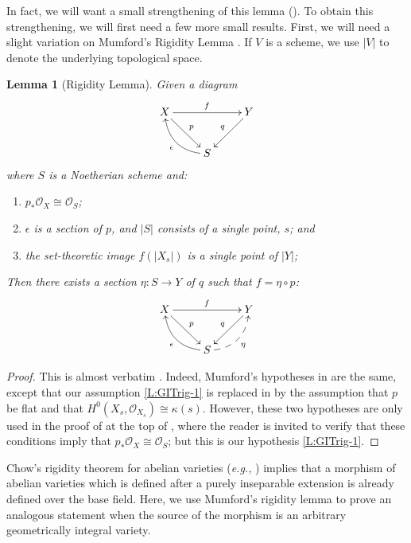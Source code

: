 \documentclass[11pt, reqno]{amsart}
\numberwithin{equation}{section}
\newtheorem{lem}[teo]{Lemma}
\theoremstyle{definition}
\theoremstyle{remark}
\def\iso{\cong}
\newcommand{\abs}[1]{{\left|#1\right|}}
\begin{document}
In fact, we will want a small strengthening of this lemma ().  To obtain this strengthening, we will first need a few more small results.  First, we will need a slight variation on 
Mumford's Rigidity Lemma \cite[Prop.~6.1(1)]{mumfordGIT}.  If $V$ is a scheme, we use $\abs V$ to denote the underlying topological space.

\begin{lem}[Rigidity Lemma]
  \label{L:GITrigidity}
   Given a diagram
\[
\xymatrix{
X \ar[rr]^f \ar[dr]^p & &Y \ar[dl]_q \\
& S \ar@/^1pc/[ul]^\epsilon}
\]
where $S$ is a Noetherian scheme and:
\begin{enumerate}[label={(\alph*)}]
\item $p_*\mathcal O_X \iso \mathcal O_S$;  \label{L:GITrig-1}
\item $\epsilon$ is a section of $p$, and $\abs S$ consists of a single point, $s$; and 
\item the set-theoretic image $f(\abs{X_s})$ is a single point of $|Y|$; 
 
\end{enumerate}
Then there exists a section $\eta:S \to Y$ of $q$ such that $f = \eta
\circ p$:
\[
\xymatrix{
X \ar[rr]^f \ar[dr]^p & &Y \ar[dl]_q \\
& S \ar@/^1pc/[ul]^\epsilon \ar@/_1pc/@{-->}[ur]_\eta}
\]
\end{lem}

\begin{proof}
This is almost verbatim \cite[Prop.~6.1(1)]{mumfordGIT}.  Indeed, Mumford's hypotheses in \cite[Prop.~6.1(1)]{mumfordGIT} are the same, except that our assumption \ref{L:GITrig-1} is replaced  in \cite[Prop.~6.1(1)]{mumfordGIT} by the assumption that  
$p$ be flat and that $H^0(X_s,\mathcal O_{X_s})\iso \kappa(s)$.
However, these two hypotheses are only used in the proof of \cite[Prop.~6.1(1)]{mumfordGIT} at the top of  \cite[p.116]{mumfordGIT}, where
the reader is invited 
 to verify that these conditions imply that
$p_*\mathcal O_X \iso \mathcal O_S$; but this is our hypothesis \ref{L:GITrig-1}.
\end{proof}



Chow's rigidity theorem for abelian varieties (\emph{e.g.,} \cite[Thm.~3.19]{conradtrace}) implies that a morphism of abelian varieties which is defined after  a purely inseparable extension is already defined over the base field.  Here, we use Mumford's rigidity lemma to prove an analogous statement when the source of the morphism is an arbitrary geometrically integral variety.
\end{document}
